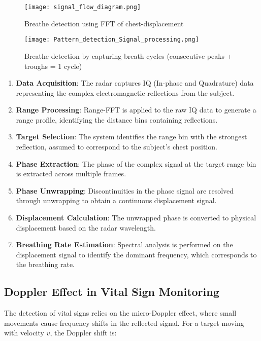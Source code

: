 \documentclass[12pt]{article}
\begin{document}
\begin{figure}[H]
\centering
\begin{minipage}{0.48\textwidth}
  \centering
  \texttt{[image: signal\_flow\_diagram.png]}
  \caption{Breathe detection using FFT of chest-displacement}
\end{minipage}%
\hfill
\begin{minipage}{0.48\textwidth}
  \centering
  \texttt{[image: Pattern\_detection\_Signal\_processing.png]}
  \caption{Breathe detection by capturing breath cycles (consecutive peaks + troughs = 1 cycle)}
\end{minipage}
\end{figure}

\begin{enumerate}
    \item \textbf{Data Acquisition}: The radar captures IQ (In-phase and Quadrature) data representing the complex electromagnetic reflections from the subject.
    
    \item \textbf{Range Processing}: Range-FFT is applied to the raw IQ data to generate a range profile, identifying the distance bins containing reflections.
    
    \item \textbf{Target Selection}: The system identifies the range bin with the strongest reflection, assumed to correspond to the subject's chest position.
    
    \item \textbf{Phase Extraction}: The phase of the complex signal at the target range bin is extracted across multiple frames.
    
    \item \textbf{Phase Unwrapping}: Discontinuities in the phase signal are resolved through unwrapping to obtain a continuous displacement signal.
    
    \item \textbf{Displacement Calculation}: The unwrapped phase is converted to physical displacement based on the radar wavelength.
    
    \item \textbf{Breathing Rate Estimation}: Spectral analysis is performed on the displacement signal to identify the dominant frequency, which corresponds to the breathing rate.
\end{enumerate}

\subsection{Doppler Effect in Vital Sign Monitoring}
The detection of vital signs relies on the micro-Doppler effect, where small movements cause frequency shifts in the reflected signal. For a target moving with velocity $v$, the Doppler shift is:
\end{document}
